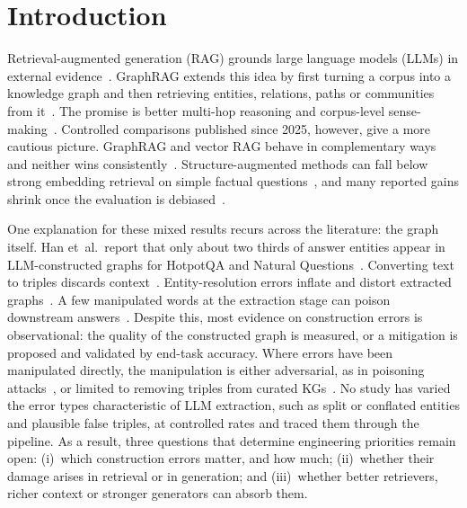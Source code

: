 \documentclass[11pt]{article}
\begin{document}
\section{Introduction}
Retrieval-augmented generation (RAG) grounds large language models (LLMs) in external evidence~\cite{lewis2020rag}. GraphRAG extends this idea by first turning a corpus into a knowledge graph and then retrieving entities, relations, paths or communities from it~\cite{edge2024local,peng2025survey,han2024graphrag}. The promise is better multi-hop reasoning and corpus-level sense-making~\cite{edge2024local,gutierrez2024hipporag,guo2025lightrag}. Controlled comparisons published since 2025, however, give a more cautious picture. GraphRAG and vector RAG behave in complementary ways and neither wins consistently~\cite{han2026ragvs,xiang2025when,zhou2025indepth}. Structure-augmented methods can fall below strong embedding retrieval on simple factual questions~\cite{gutierrez2025rag2memory}, and many reported gains shrink once the evaluation is debiased~\cite{zeng2025significant}.

One explanation for these mixed results recurs across the literature: the graph itself. Han et~al.\ report that only about two thirds of answer entities appear in LLM-constructed graphs for HotpotQA and Natural Questions~\cite{han2026ragvs}. Converting text to triples discards context~\cite{huang2025tcrqf}. Entity-resolution errors inflate and distort extracted graphs~\cite{cai2025extraction}. A few manipulated words at the extraction stage can poison downstream answers~\cite{wen2025fewwords,liang2025underfire}. Despite this, most evidence on construction errors is observational: the quality of the constructed graph is measured, or a mitigation is proposed and validated by end-task accuracy. Where errors have been manipulated directly, the manipulation is either adversarial, as in poisoning attacks~\cite{wen2025fewwords,liang2025underfire}, or limited to removing triples from curated KGs~\cite{zhou2025incomplete,wang2026missdiag}. No study has varied the error types characteristic of LLM extraction, such as split or conflated entities and plausible false triples, at controlled rates and traced them through the pipeline. As a result, three questions that determine engineering priorities remain open:
(i)~which construction errors matter, and how much; (ii)~whether their damage arises in retrieval or in generation; and (iii)~whether better retrievers, richer context or stronger generators can absorb them.
\end{document}
